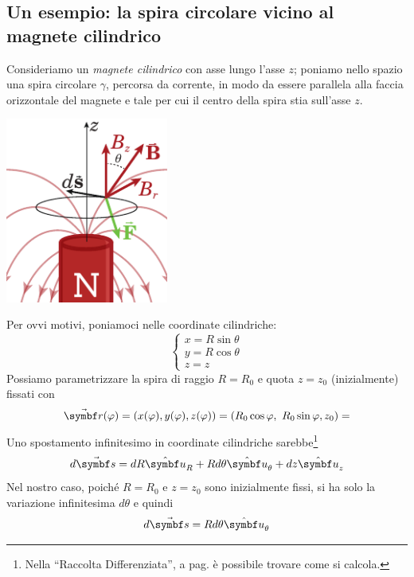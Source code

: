 \subsection{Un esempio: la spira circolare vicino al magnete cilindrico}
Consideriamo un \textit{magnete cilindrico} con asse lungo l'asse $z$; poniamo nello spazio una spira circolare $\gamma$, percorsa da corrente, in modo da essere parallela alla faccia orizzontale del magnete e tale per cui il centro della spira stia sull'asse $z$.
\begin{center}
	\includegraphics[width=0.4\textwidth]{images/chp8/chp8magnetecilindrico1.pdf}
\end{center}
Per ovvi motivi, poniamoci nelle coordinate cilindriche:
\begin{equation*}
	\begin{cases}
		x=R\sin\theta\\
		y=R\cos\theta\\
		z=z
	\end{cases}
\end{equation*}
Possiamo parametrizzare la spira di raggio $R=R_0$ e quota $z=z_0$ (inizialmente) fissati con
\begin{equation*}
	\vba{r}(\phi)=\left(x(\phi),y(\phi),z(\phi)\right)=\left(R_0\cos\phi,\ R_0\sin\phi, z_0\right)=
\end{equation*}
Uno spostamento infinitesimo in coordinate cilindriche sarebbe\footnote{Nella ``Raccolta Differenziata'', a pag. \pageref{spinfinitesimocilindriche} è possibile trovare come si calcola.}
\begin{equation*}
	d\vba{s}=dR\vbh{u}_R+Rd\theta\vbh{u}_\theta+dz\vbh{u}_z
\end{equation*}
Nel nostro caso, poiché $R=R_0$ e $z=z_0$ sono inizialmente fissi, si ha solo la variazione infinitesima $d\theta$ e quindi
\begin{equation*}
	d\vba{s}=Rd\theta\vbh{u}_\theta
\end{equation*}
